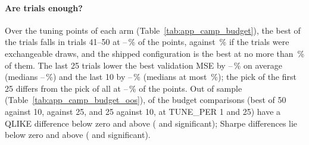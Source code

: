 \paragraph{Are \campOptTrials{} trials enough?} Over the \campOptPoints{} tuning points of
each arm (Table~\ref{tab:app_camp_budget}), the best of the \campOptTrials{} trials falls in
trials 41--50 at \campOptLateLo--\campOptLateHi\,\% of the points, against
\campOptExch\,\% if the trials were exchangeable draws, and the shipped configuration is the
best at no more than \campOptShippedHi\,\% of them. The last 25 trials lower the best
validation MSE by \campOptGainTwentyFiveLo--\campOptGainTwentyFiveHi\,\% on average (medians
\campOptGainTwentyFiveMedLo--\campOptGainTwentyFiveMedHi\,\%) and the last 10 by
\campOptGainFortyLo--\campOptGainFortyHi\,\% (medians at most \campOptGainFortyMedMax\,\%);
the pick of the first 25 differs from the pick of all \campOptTrials{} at
\campOptPickDiffLo--\campOptPickDiffHi\,\% of the points. Out of sample
(Table~\ref{tab:app_camp_budget_oos}), of the \campBudN{} budget comparisons (best of 50
against 10, against 25, and 25 against 10, at TUNE\_PER 1 and 25) \campBudQBelow{} have a
QLIKE difference below zero and \campBudQAbove{} above (\campBudQBelowSig{} and
\campBudQAboveSig{} significant); \campBudSBelow{} Sharpe differences lie below zero and
\campBudSAbove{} above (\campBudSBelowSig{} and \campBudSAboveSig{} significant).

